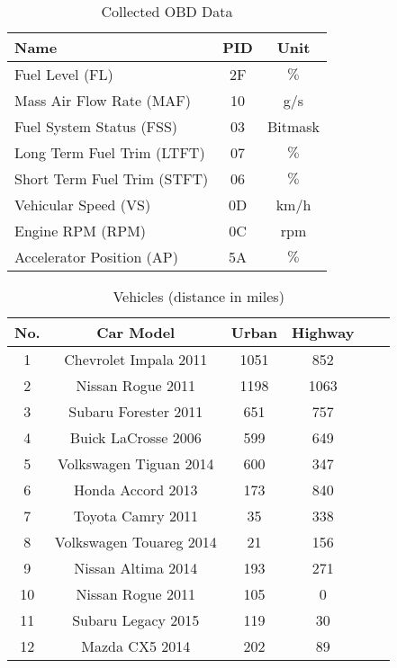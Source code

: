 

\begin{table}[ht]
        \centering
        \caption[obd_data]{Collected OBD Data}
         \vspace{0.5cm}
        \label{obd_data}
                \begin{tabular}{|l|c|c|}
                \hline
Name & PID & Unit 
\\  \hline      \hline
Fuel Level (FL) & 2F & $\%$     
\\  \hline
Mass Air Flow Rate (MAF) & 10 & g/s   
\\   \hline
Fuel System Status (FSS) & 03  & Bitmask  
\\  \hline
Long Term Fuel Trim (LTFT) & 07  &  $\%$  
\\  \hline
Short Term Fuel Trim (STFT) & 06 &  $\%$  
\\   \hline
Vehicular Speed (VS) &  0D &  km/h   
\\  \hline
Engine RPM (RPM) & 0C & rpm 
\\   \hline
Accelerator Position (AP) & 5A & $\%$  
\\   \hline
      \end{tabular}
\end{table}




\begin{table}[ht]
      \centering
     \caption[vehicles]{Vehicles (distance in miles)}
         \vspace{0.5cm}
        \label{vehicles}
                \begin{tabular}{|c|c|c|c|c|c|}
                \hline
No. & Car Model  & Urban & Highway  
\\  \hline      \hline
1  & Chevrolet Impala 2011 &  1051   &  852
\\  \hline
2 & Nissan Rogue 2011   &  1198 &  1063 
\\   \hline
3 & Subaru Forester 2011 & 651  & 757
\\   \hline
4  &Buick LaCrosse 2006 & 599  & 649 
\\   \hline
5  & Volkswagen Tiguan 2014  & 600  & 347 
\\   \hline
6 & Honda Accord  2013 & 173 & 840
\\   \hline
7 & Toyota Camry 2011    & 35  &  338
\\   \hline
8  & Volkswagen Touareg 2014  & 21  & 156 
\\   \hline
9 & Nissan Altima 2014  & 193 & 271
\\ \hline
10 & Nissan Rogue 2011   & 105  &  0 
\\ \hline
11 & Subaru Legacy 2015 & 119 & 30
\\   \hline
12 & Mazda CX5 2014 & 202  & 89
\\   \hline
    \end{tabular}
\end{table}


